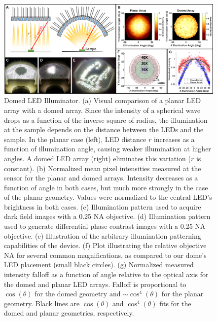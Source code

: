 \begin{figure} [ht]
\begin{center}
\includegraphics[width=\textwidth]{figures/fig_ccs_dome.png}
\end{center}
\caption {{ Domed LED Illuminator.}
{(a)} Visual comparison of a planar LED array with a domed array. Since the intensity of a spherical wave drops as a function of the inverse square of radius, the illumination at the sample depends on the distance between the LEDs and the sample. In the planar case (left), LED distance $r$ increases as a function of illumination angle, causing weaker illumination at higher angles. A domed LED array (right) eliminates this variation ($r$ is constant).
{(b)} Normalized mean pixel intensities measured at the sensor for the planar and domed arrays. Intensity decreases as a function of angle in both cases, but much more strongly in the case of the planar geometry. Values were normalized to the central LED's brightness in both cases.
{(c)} Illumination pattern used to acquire dark field images with a 0.25 NA objective.
{(d)} Illumination pattern used to generate differential phase contrast images with a 0.25 NA objective.
{(e)} Illustration of the arbitrary illumination patterning capabilities of the device.
{(f)} Plot illustrating the relative objective NA for several common magnifications, as compared to our dome's LED placement (small black circles).
{(g)} Normalized measured intensity falloff as a function of angle relative to the optical axis for the domed and planar LED arrays. Falloff is proportional to $\cos(\theta)$ for the domed geometry and $\sim\cos^4(\theta)$ for the planar geometry. Black lines are $\cos(\theta)$ and $\cos^4(\theta)$ fits for the domed and planar geometries, respectively.
}
\label{fig:fabrication_ccs_dome}
\end{figure}

